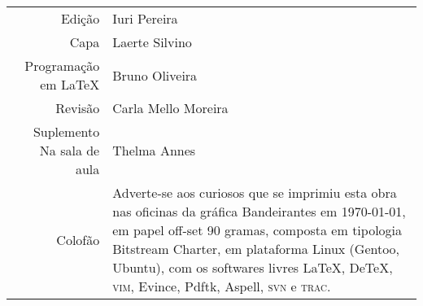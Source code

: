 
\newcommand{\putline}[2]{#1 & #2\\}

%
\ifodd\thepage\paginabranca\else\clearpage\fi
\pagebreak
\thispagestyle{empty}

\noindent\begin{tabular}{rp{}}\small
    \putline{Edição}{Iuri Pereira}
		\putline{Capa}{Laerte Silvino}
		\putline{Programação em \LaTeX}{Bruno Oliveira}
		\putline{Revisão}{Carla Mello Moreira}
		\putline{Suplemento Na sala de aula}{Thelma Annes}
		\putline{Colofão}{Adverte-se aos curiosos que se
			imprimiu esta obra nas oficinas da gráfica
			Bandeirantes em \today, em papel 
			\mbox{off-set} 90 gramas,
			composta em tipologia Bitstream Charter, 
			em plataforma Linux (Gentoo, Ubuntu), 
			com os softwares livres 
			\LaTeX, De\TeX, \textsc{vim}, Evince, Pdftk, 
			Aspell, \textsc{svn} e \textsc{trac}.}
\end{tabular}

